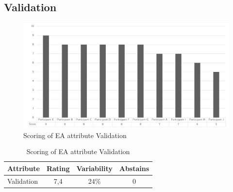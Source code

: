 \subsection{Validation}
\begin{figure}[h!]
	\centering
	\includegraphics[width=0.9\linewidth]{images/scoreeavalidation}
	\caption[Scoring of EA attribute Validation]{Scoring of EA attribute Validation}
	\label{fig:appscoringeavalidation}
\end{figure}
\begin{table}[h!]
	\centering
	\begin{tabular}{p{}ccc}
		\toprule
		\textbf{Attribute} & \textbf{Rating} & \textbf{Variability} & \textbf{Abstains} \\
		\midrule
		Validation & 7,4 & 24\% & 0 \\%
		\bottomrule
	\end{tabular}%
	\caption[Scoring of EA attribute Validation]{Scoring of EA attribute Validation}
	\label{tab:appscoringeavalidation}%
\end{table}%
\newpage

